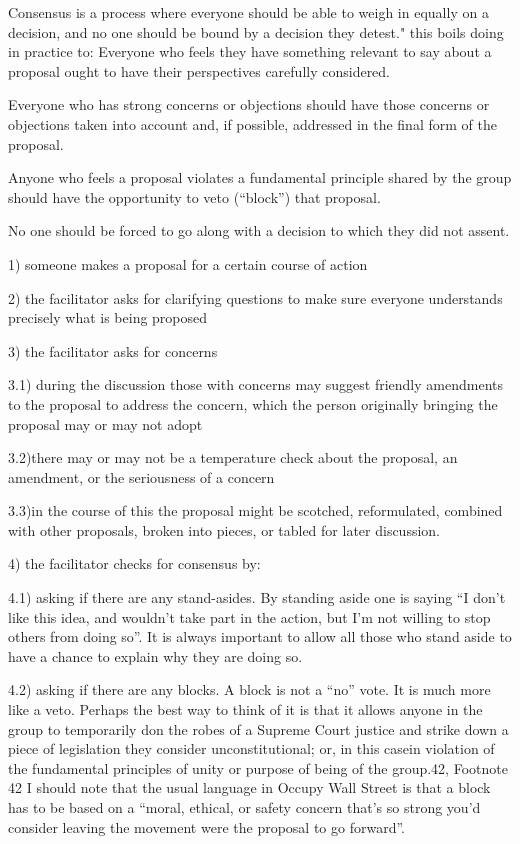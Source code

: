 \documentclass{article}
\begin{document}
Consensus is a process where everyone should be able to weigh in equally on a decision, and no one should be bound by a decision they detest."
this boils doing in practice to: Everyone who feels they have something relevant to say about a proposal ought to have their perspectives carefully considered.

Everyone who has strong concerns or objections should have those concerns or objections taken into account and, if possible, addressed in the final form of the proposal.

Anyone who feels a proposal violates a fundamental principle shared by the group should have the opportunity to veto (“block”) that proposal.

No one should be forced to go along with a decision to which they did not assent.

1) someone makes a proposal for a certain course of action

2) the facilitator asks for clarifying questions to make sure everyone understands precisely what is being proposed

3) the facilitator asks for concerns

3.1) during the discussion those with concerns may suggest friendly amendments to the proposal to address the concern, which the person originally bringing the proposal may or may not adopt

3.2)there may or may not be a temperature check about the proposal, an amendment, or the seriousness of a concern

3.3)in the course of this the proposal might be scotched, reformulated, combined with other proposals, broken into pieces, or tabled for later discussion.

4) the facilitator checks for consensus by:

4.1) asking if there are any stand-asides. By standing aside one is saying “I don’t like this idea, and wouldn’t take part in the action, but I’m not willing to stop others from doing so”. It is always important to allow all those who stand aside to have a chance to explain why they are doing so.

4.2) asking if there are any blocks. A block is not a “no” vote. It is much more like a veto. Perhaps the best way to think of it is that it allows anyone in the group to temporarily don the robes of a Supreme Court justice and strike down a piece of legislation they consider unconstitutional; or, in this casein violation of the fundamental principles of unity or purpose of being of the group.{42},
Footnote {42} I should note that the usual language in Occupy Wall Street is that a block has to be based on a “moral, ethical, or safety concern that’s so strong you’d consider leaving the movement were the proposal to go forward”.
\end{document}
